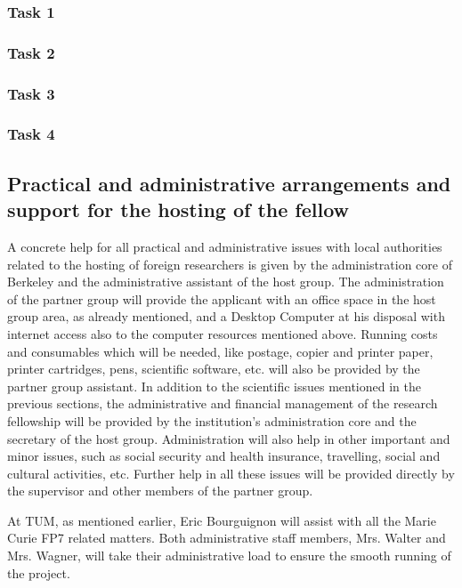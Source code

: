 \subsubsection{Task 1}
\subsubsection{Task 2}
\subsubsection{Task 3}
\subsubsection{Task 4}
\subsection{Practical and administrative arrangements and support for the hosting of the fellow 
} 
A concrete help for all practical and administrative issues with local authorities related to 
the hosting of foreign researchers is given by the administration core of Berkeley and the 
administrative assistant of the host group. The administration of the partner group will 
provide the applicant with an office space in the host group area, as already mentioned, 
and a Desktop Computer at his disposal with internet access also to the computer 
resources mentioned above. Running costs and consumables which will be needed, like 
postage, copier and printer paper, printer cartridges, pens, scientific software, etc. will 
also be provided by the partner group assistant. 
In addition to the scientific issues mentioned in the previous sections, the administrative 
and financial management of the research fellowship will be provided by the institution's 
administration core and the secretary of the host group. Administration will also help in 
other important and minor issues, such as social security and health insurance, travelling, 
social and cultural activities, etc. Further help in all these issues will be provided directly 
by the supervisor and other members of the partner group.

At TUM, as mentioned earlier, Eric Bourguignon  will assist with all the
Marie Curie FP7 related matters. Both  administrative staff members, Mrs. Walter and
Mrs. Wagner, will take their administrative load  to ensure the smooth running of the
project.
\newpage
